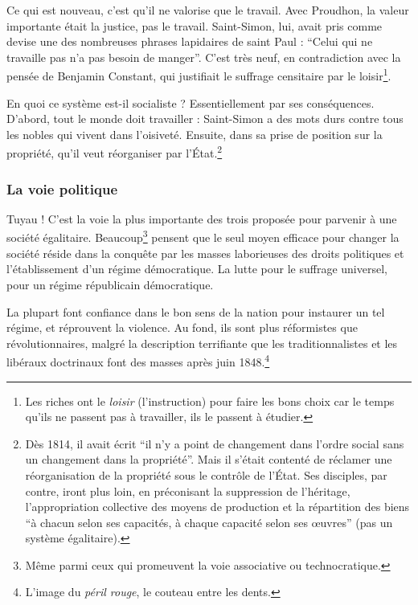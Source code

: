\documentclass[12pt]{report}
\begin{document}
Ce qui est nouveau, c'est qu'il ne valorise que le travail. Avec Proudhon, la valeur importante était la justice, pas le travail. Saint-Simon, lui, avait pris comme devise une des nombreuses phrases lapidaires de saint Paul : \enquote{Celui qui ne travaille pas n'a pas besoin de manger}.
C'est très neuf, en contradiction avec la pensée de Benjamin Constant, qui justifiait le suffrage censitaire par le loisir\footnote{Les riches ont le \emph{loisir} (l'instruction) pour faire les bons choix car le temps qu'ils ne passent pas à travailler, ils le passent à étudier.}.

En quoi ce système est-il socialiste ? Essentiellement par ses conséquences. D'abord, tout le monde doit travailler : Saint-Simon a des mots durs contre tous les nobles qui vivent dans l'oisiveté. Ensuite, dans sa prise de position sur la propriété, qu'il veut réorganiser par l'État.\footnote{Dès 1814, il avait écrit \enquote{il n'y a point de changement dans l'ordre social sans un changement dans la propriété}. Mais il s'était contenté de réclamer une réorganisation de la propriété sous le contrôle de l'État. Ses disciples, par contre, iront plus loin, en préconisant la suppression de l'héritage, l'appropriation collective des moyens de production et la répartition des biens \enquote{à chacun selon ses capacités, à chaque capacité selon ses œuvres} (pas un système égalitaire).}

\subsubsection{La voie politique}

Tuyau ! C'est la voie la plus importante des trois proposée pour parvenir à une société égalitaire.
Beaucoup\footnote{Même parmi ceux qui promeuvent la voie associative ou technocratique.} pensent que le seul moyen efficace pour changer la société réside dans la conquête par les masses laborieuses des droits politiques et l'établissement d'un régime démocratique. La lutte pour le suffrage universel, pour un régime républicain démocratique. 

La plupart font confiance dans le bon sens de la nation pour instaurer un tel régime, et réprouvent la violence.
Au fond, ils sont plus réformistes que révolutionnaires, malgré la description terrifiante que les traditionnalistes et les libéraux doctrinaux font des masses après juin 1848.\footnote{L'image du \emph{péril rouge}, le couteau entre les dents.}
\end{document}
